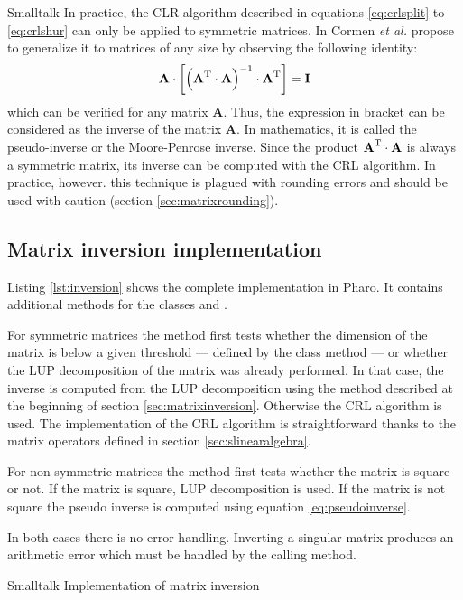 \begin{displaycode}{Smalltalk}
In practice, the CLR algorithm described in equations
\ref{eq:crlsplit} to \ref{eq:crlshur} can only be applied to
symmetric matrices. In \cite{CorLeiRiv} Cormen \textit{et al.}
propose to generalize it to matrices of any size by observing the
following identity:
\begin{equation}
\label{eq:pseudoinverse}
  \textbf{A}\cdot\left[\left(\textbf{A}^{\mathop\textrm{T}}\cdot\textbf{A}\right)^{-1}\cdot\textbf{A}^{\mathop\textrm{T}}\right]=\textbf{I}
\end{equation}
which can be verified for any matrix $\textbf{A}$. Thus, the
expression in bracket can be considered as the inverse of the
matrix $\textbf{A}$. In mathematics, it is called the pseudo-inverse
or the Moore-Penrose inverse. Since the product
$\textbf{A}^{\mathop\textrm{T}}\cdot\textbf{A}$ is always a symmetric matrix, its
inverse can be computed with the CRL algorithm. In practice,
however. this technique is plagued with rounding errors and should
be used with caution (\cf section \ref{sec:matrixrounding}).

\subsection{Matrix inversion implementation}
Listing \ref{lst:inversion} shows the complete implementation in
Pharo. It contains additional methods for the classes  and .

For symmetric matrices the method  first tests
whether the dimension of the matrix is below a given threshold ---
defined by the class method  --- or
whether the LUP decomposition of the matrix was already performed.
In that case, the inverse is computed from the LUP decomposition
using the method described at the beginning of section
\ref{sec:matrixinversion}. Otherwise the CRL algorithm is used.
The implementation of the CRL algorithm is straightforward thanks
to the matrix operators defined in section
\ref{sec:slinearalgebra}.

For non-symmetric matrices the method  first tests
whether the matrix is square or not. If the matrix is square, LUP
decomposition is used. If the matrix is not square the pseudo
inverse is computed using equation \ref{eq:pseudoinverse}.

In both cases there is no error handling. Inverting a singular
matrix produces an arithmetic error which must be handled by the
calling method.

\begin{listing}[label=lst:inversion]{Smalltalk}
{Implementation of matrix inversion}
%
%
\end{listing}


\end{displaycode}

